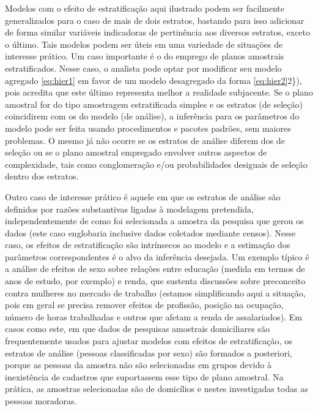 \documentclass[]{book}
\numberwithin{example}{chapter}
\numberwithin{remark}{chapter}
\numberwithin{definition}{chapter}
\begin{document}
Modelos com o efeito de estratificação aqui ilustrado podem ser
facilmente generalizados para o caso de mais de dois estratos, bastando
para isso adicionar de forma similar variáveis indicadoras de
pertinência aos diversos estratos, exceto o último. Tais modelos podem
ser úteis em uma variedade de situações de interesse prático. Um caso
importante é o do emprego de planos amostrais estratificados. Nesse
caso, o analista pode optar por modificar seu modelo agregado
\eqref{eq:hier1} em favor de um modelo desagregado da forma
\eqref{eq:hier2}2\}), pois acredita que este último representa melhor a
realidade subjacente. Se o plano amostral for do tipo amostragem
estratificada simples e os estratos (de seleção) coincidirem com os do
modelo (de análise), a inferência para os parâmetros do modelo pode ser
feita usando procedimentos e pacotes padrões, sem maiores problemas. O
mesmo já não ocorre se os estratos de análise diferem dos de seleção ou
se o plano amostral empregado envolver outros aspectos de complexidade,
tais como conglomeração e/ou probabilidades desiguais de seleção dentro
dos estratos.

Outro caso de interesse prático é aquele em que os estratos de análise
são definidos por razões substantivas ligadas à modelagem pretendida,
independentemente de como foi selecionada a amostra da pesquisa que
gerou os dados (este caso englobaria inclusive dados coletados mediante
censos). Nesse caso, os efeitos de estratificação são intrínsecos ao
modelo e a estimação dos parâmetros correspondentes é o alvo da
inferência desejada. Um exemplo típico é a análise de efeitos de sexo
sobre relações entre educação (medida em termos de anos de estudo, por
exemplo) e renda, que sustenta discussões sobre preconceito contra
mulheres no mercado de trabalho (estamos simplificando aqui a situação,
pois em geral se precisa remover efeitos de profissão, posição na
ocupação, número de horas trabalhadas e outros que afetam a renda de
assalariados). Em casos como este, em que dados de pesquisas amostrais
domiciliares são frequentemente usados para ajustar modelos com efeitos
de estratificação, os estratos de análise (pessoas classificadas por
sexo) são formados a posteriori, porque as pessoas da amostra não são
selecionadas em grupos devido à inexistência de cadastros que
suportassem esse tipo de plano amostral. Na prática, as amostras
selecionadas são de domicílios e nestes investigadas todas as pessoas
moradoras.
\end{document}
